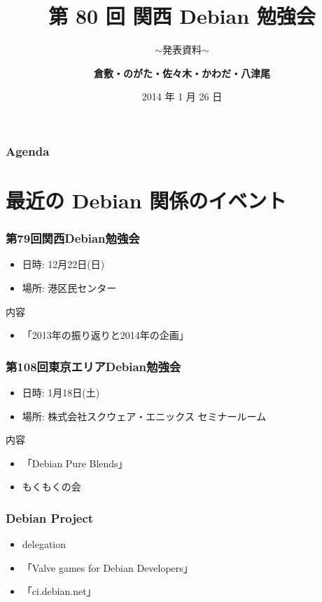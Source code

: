 \documentclass[cjk,dvipdfmx,10pt,compress,%
hyperref={bookmarks=true,bookmarksnumbered=true,bookmarksopen=false,%
colorlinks=false,%
pdftitle={第 80 回 関西 Debian 勉強会},%
pdfauthor={倉敷・のがた・佐々木・かわだ・八津尾},%
pdfsubject={資料},%
}]{beamer}
\title{第 80 回 関西 Debian 勉強会}
\subtitle{$\sim$発表資料$\sim$}
\author[かわだ てつたろう]{{\large\bf 倉敷・のがた・佐々木・かわだ・八津尾}}
\institute[Debian JP]{{\normalsize\tt 関西 Debian 勉強会}}
\date{{\small 2014 年 1 月 26 日}}
\begin{document}
\settitleslide
\begin{frame}
\titlepage
\end{frame}
\setdefaultslide

\begin{frame}[fragile]
\frametitle{Agenda}

\tableofcontents

\end{frame}

\section{最近の Debian 関係のイベント}


\begin{frame}[fragile]
  \frametitle{第79回関西Debian勉強会}
  \begin{itemize}
  \item 日時: 12月22日(日)
  \item 場所: 港区民センター
  \end{itemize}
  \begin{block}{内容}
    \begin{itemize}
    \item 「2013年の振り返りと2014年の企画」
    \end{itemize}
  \end{block}
\end{frame}

\begin{frame}[fragile]
  \frametitle{第108回東京エリアDebian勉強会}
  \begin{itemize}
  \item 日時: 1月18日(土)
  \item 場所: 株式会社スクウェア・エニックス セミナールーム
  \end{itemize}
  \begin{block}{内容}
    \begin{itemize}
    \item 「Debian Pure Blends」
    \item もくもくの会
    \end{itemize}
  \end{block}
\end{frame}

\begin{frame}[fragile]
  \frametitle{Debian Project}
  \begin{itemize}
  \item delegation
  \item 「Valve games for Debian Developers」
  \item 「ci.debian.net」
  \end{itemize}
\end{frame}
\end{document}

